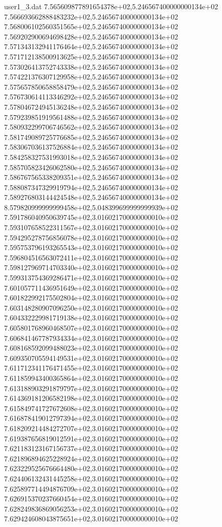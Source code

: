 \begin{filecontents}{user1_3.dat}
7.565609877891654378e+02,5.246567400000000134e+02
7.566693662888483232e+02,5.246567400000000134e+02
7.568006102560351565e+02,5.246567400000000134e+02
7.569202900694698428e+02,5.246567400000000134e+02
7.571343132941176464e+02,5.246567400000000134e+02
7.571712138500913625e+02,5.246567400000000134e+02
7.573026413752743338e+02,5.246567400000000134e+02
7.574221376307129958e+02,5.246567400000000134e+02
7.575657850658858479e+02,5.246567400000000134e+02
7.576730614113346292e+02,5.246567400000000134e+02
7.578046724945136248e+02,5.246567400000000134e+02
7.579239851919561488e+02,5.246567400000000134e+02
7.580932299706746562e+02,5.246567400000000134e+02
7.581749089725776685e+02,5.246567400000000134e+02
7.583067036137526884e+02,5.246567400000000134e+02
7.584258327531993018e+02,5.246567400000000134e+02
7.585705823426062580e+02,5.246567400000000134e+02
7.586767565338209351e+02,5.246567400000000134e+02
7.588087347329919794e+02,5.246567400000000134e+02
7.589276803144424548e+02,5.246567400000000134e+02
8.579820999999999458e+02,5.048399699999999939e+02
7.591786040950639745e+02,3.016021700000000010e+02
7.593107658522311567e+02,3.016021700000000010e+02
7.594295278756856078e+02,3.016021700000000010e+02
7.595753796193265543e+02,3.016021700000000010e+02
7.596804516563072411e+02,3.016021700000000010e+02
7.598127969714703340e+02,3.016021700000000010e+02
7.599313754369286471e+02,3.016021700000000010e+02
7.601057711436951649e+02,3.016021700000000010e+02
7.601822992175502804e+02,3.016021700000000010e+02
7.603148280907096250e+02,3.016021700000000010e+02
7.604332229981719138e+02,3.016021700000000010e+02
7.605801768960468507e+02,3.016021700000000010e+02
7.606841467787934334e+02,3.016021700000000010e+02
7.608168592099488023e+02,3.016021700000000010e+02
7.609350705594149531e+02,3.016021700000000010e+02
7.611712341176471455e+02,3.016021700000000010e+02
7.611859943400365864e+02,3.016021700000000010e+02
7.613188903291879797e+02,3.016021700000000010e+02
7.614369181206582198e+02,3.016021700000000010e+02
7.615849741727672608e+02,3.016021700000000010e+02
7.616878419012797394e+02,3.016021700000000010e+02
7.618209214484272707e+02,3.016021700000000010e+02
7.619387656819012591e+02,3.016021700000000010e+02
7.621183123167156737e+02,3.016021700000000010e+02
7.621896894625228924e+02,3.016021700000000010e+02
7.623229525676664480e+02,3.016021700000000010e+02
7.624406132431445258e+02,3.016021700000000010e+02
7.625897714494876709e+02,3.016021700000000010e+02
7.626915370237660454e+02,3.016021700000000010e+02
7.628249836869056253e+02,3.016021700000000010e+02
7.629424608043875651e+02,3.016021700000000010e+02

\end{filecontents}
